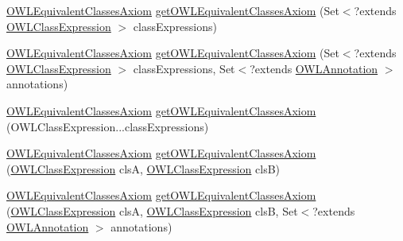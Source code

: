 \begin{DoxyCompactItemize}
\item 
\hyperlink{interfaceorg_1_1semanticweb_1_1owlapi_1_1model_1_1_o_w_l_equivalent_classes_axiom}{O\-W\-L\-Equivalent\-Classes\-Axiom} \hyperlink{interfaceorg_1_1semanticweb_1_1owlapi_1_1model_1_1_o_w_l_data_factory_a15d324e52dd7734e60cb6da9b7e1e4b7}{get\-O\-W\-L\-Equivalent\-Classes\-Axiom} (Set$<$?extends \hyperlink{interfaceorg_1_1semanticweb_1_1owlapi_1_1model_1_1_o_w_l_class_expression}{O\-W\-L\-Class\-Expression} $>$ class\-Expressions)
\item 
\hyperlink{interfaceorg_1_1semanticweb_1_1owlapi_1_1model_1_1_o_w_l_equivalent_classes_axiom}{O\-W\-L\-Equivalent\-Classes\-Axiom} \hyperlink{interfaceorg_1_1semanticweb_1_1owlapi_1_1model_1_1_o_w_l_data_factory_a563aecba8f84a395c6b7c27504e5d4be}{get\-O\-W\-L\-Equivalent\-Classes\-Axiom} (Set$<$?extends \hyperlink{interfaceorg_1_1semanticweb_1_1owlapi_1_1model_1_1_o_w_l_class_expression}{O\-W\-L\-Class\-Expression} $>$ class\-Expressions, Set$<$?extends \hyperlink{interfaceorg_1_1semanticweb_1_1owlapi_1_1model_1_1_o_w_l_annotation}{O\-W\-L\-Annotation} $>$ annotations)
\item 
\hyperlink{interfaceorg_1_1semanticweb_1_1owlapi_1_1model_1_1_o_w_l_equivalent_classes_axiom}{O\-W\-L\-Equivalent\-Classes\-Axiom} \hyperlink{interfaceorg_1_1semanticweb_1_1owlapi_1_1model_1_1_o_w_l_data_factory_ab3786de7736e55325c04fde6d641011b}{get\-O\-W\-L\-Equivalent\-Classes\-Axiom} (O\-W\-L\-Class\-Expression...\-class\-Expressions)
\item 
\hyperlink{interfaceorg_1_1semanticweb_1_1owlapi_1_1model_1_1_o_w_l_equivalent_classes_axiom}{O\-W\-L\-Equivalent\-Classes\-Axiom} \hyperlink{interfaceorg_1_1semanticweb_1_1owlapi_1_1model_1_1_o_w_l_data_factory_acc3f44d4b20818b98879e265ccb4aaa0}{get\-O\-W\-L\-Equivalent\-Classes\-Axiom} (\hyperlink{interfaceorg_1_1semanticweb_1_1owlapi_1_1model_1_1_o_w_l_class_expression}{O\-W\-L\-Class\-Expression} cls\-A, \hyperlink{interfaceorg_1_1semanticweb_1_1owlapi_1_1model_1_1_o_w_l_class_expression}{O\-W\-L\-Class\-Expression} cls\-B)
\item 
\hyperlink{interfaceorg_1_1semanticweb_1_1owlapi_1_1model_1_1_o_w_l_equivalent_classes_axiom}{O\-W\-L\-Equivalent\-Classes\-Axiom} \hyperlink{interfaceorg_1_1semanticweb_1_1owlapi_1_1model_1_1_o_w_l_data_factory_a458fd91adedf0d0cbb71f49530a745d7}{get\-O\-W\-L\-Equivalent\-Classes\-Axiom} (\hyperlink{interfaceorg_1_1semanticweb_1_1owlapi_1_1model_1_1_o_w_l_class_expression}{O\-W\-L\-Class\-Expression} cls\-A, \hyperlink{interfaceorg_1_1semanticweb_1_1owlapi_1_1model_1_1_o_w_l_class_expression}{O\-W\-L\-Class\-Expression} cls\-B, Set$<$?extends \hyperlink{interfaceorg_1_1semanticweb_1_1owlapi_1_1model_1_1_o_w_l_annotation}{O\-W\-L\-Annotation} $>$ annotations)

\end{DoxyCompactItemize}

